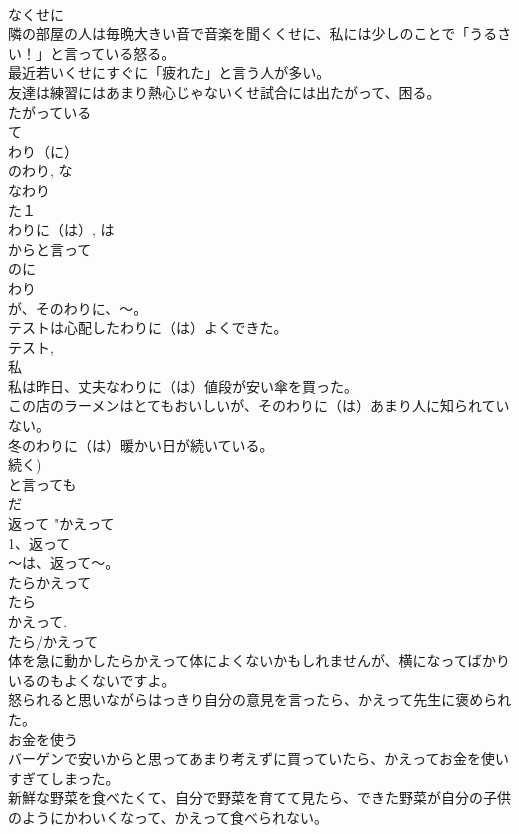 \documentclass[8pt]{extreport}
\begin{document}
\begin{CJK}{UTF8}{min}
\\	なくせに 
\\	隣の部屋の人は毎晩大きい音で音楽を聞くくせに、私には少しのことで「うるさい！」と言っている怒る。 
\\	最近若いくせにすぐに「疲れた」と言う人が多い。 
\\	友達は練習にはあまり熱心じゃないくせ試合には出たがって、困る。 
\\	たがっている 
\\	て 
\\	わり（に） 
\\	のわり, な
\\	なわり 
\\	た１
\\	わりに（は）, は 
\\	からと言って 
\\	のに 
\\	わり 
\\	が、そのわりに、～。　
\\	テストは心配したわりに（は）よくできた。 
\\	テスト, 
\\	私 
\\	私は昨日、丈夫なわりに（は）値段が安い傘を買った。 
\\	この店のラーメンはとてもおいしいが、そのわりに（は）あまり人に知られていない。 
\\	冬のわりに（は）暖かい日が続いている。 
\\	続く) 
\\	と言っても
\\	だ 
\\	返って	"かえって 
\\	1、返って
\\	～は、返って～。 
\\	たらかえって 
\\	たら 
\\	かえって. 
\\	たら/かえって 
\\	体を急に動かしたらかえって体によくないかもしれませんが、横になってばかりいるのもよくないですよ。 
\\	怒られると思いながらはっきり自分の意見を言ったら、かえって先生に褒められた。 
\\	お金を使う　　
\\	バーゲンで安いからと思ってあまり考えずに買っていたら、かえってお金を使いすぎてしまった。 
\\	新鮮な野菜を食べたくて、自分で野菜を育てて見たら、できた野菜が自分の子供のようにかわいくなって、かえって食べられない。 

\end{CJK}
\end{document}
